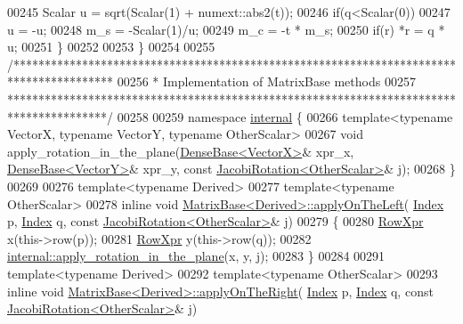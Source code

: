 \begin{DoxyCode}
00245     Scalar u = sqrt(Scalar(1) + numext::abs2(t));
00246     \textcolor{keywordflow}{if}(q<Scalar(0))
00247       u = -u;
00248     m\_s = -Scalar(1)/u;
00249     m\_c = -t * m\_s;
00250     \textcolor{keywordflow}{if}(r) *r = q * u;
00251   \}
00252 
00253 \}
00254 
00255 \textcolor{comment}{/****************************************************************************************}
00256 \textcolor{comment}{*   Implementation of MatrixBase methods}
00257 \textcolor{comment}{****************************************************************************************/}
00258 
00259 \textcolor{keyword}{namespace }\hyperlink{namespaceinternal}{internal} \{
00266 \textcolor{keyword}{template}<\textcolor{keyword}{typename} VectorX, \textcolor{keyword}{typename} VectorY, \textcolor{keyword}{typename} OtherScalar>
00267 \textcolor{keywordtype}{void} apply\_rotation\_in\_the\_plane(\hyperlink{group___core___module_class_eigen_1_1_dense_base}{DenseBase<VectorX>}& xpr\_x, 
      \hyperlink{group___core___module_class_eigen_1_1_dense_base}{DenseBase<VectorY>}& xpr\_y, \textcolor{keyword}{const} \hyperlink{group___jacobi___module_class_eigen_1_1_jacobi_rotation}{JacobiRotation<OtherScalar>}& 
      j);
00268 \}
00269 
00276 \textcolor{keyword}{template}<\textcolor{keyword}{typename} Derived>
00277 \textcolor{keyword}{template}<\textcolor{keyword}{typename} OtherScalar>
00278 \textcolor{keyword}{inline} \textcolor{keywordtype}{void} \hyperlink{group___core___module_a3a08ad41e81d8ad4a37b5d5c7490e765}{MatrixBase<Derived>::applyOnTheLeft}(
      \hyperlink{namespace_eigen_a62e77e0933482dafde8fe197d9a2cfde}{Index} p, \hyperlink{namespace_eigen_a62e77e0933482dafde8fe197d9a2cfde}{Index} q, \textcolor{keyword}{const} \hyperlink{group___jacobi___module_class_eigen_1_1_jacobi_rotation}{JacobiRotation<OtherScalar>}& j)
00279 \{
00280   \hyperlink{group___core___module_class_eigen_1_1_block}{RowXpr} x(this->row(p));
00281   \hyperlink{group___core___module_class_eigen_1_1_block}{RowXpr} y(this->row(q));
00282   \hyperlink{namespace_eigen_1_1internal_a5f7738a5c56c9b9decf94d9728ba7906}{internal::apply\_rotation\_in\_the\_plane}(x, y, j);
00283 \}
00284 
00291 \textcolor{keyword}{template}<\textcolor{keyword}{typename} Derived>
00292 \textcolor{keyword}{template}<\textcolor{keyword}{typename} OtherScalar>
00293 \textcolor{keyword}{inline} \textcolor{keywordtype}{void} \hyperlink{group___core___module_a45d91752925d2757fc8058a293b15462}{MatrixBase<Derived>::applyOnTheRight}(
      \hyperlink{namespace_eigen_a62e77e0933482dafde8fe197d9a2cfde}{Index} p, \hyperlink{namespace_eigen_a62e77e0933482dafde8fe197d9a2cfde}{Index} q, \textcolor{keyword}{const} \hyperlink{group___jacobi___module_class_eigen_1_1_jacobi_rotation}{JacobiRotation<OtherScalar>}& j)

\end{DoxyCode}
